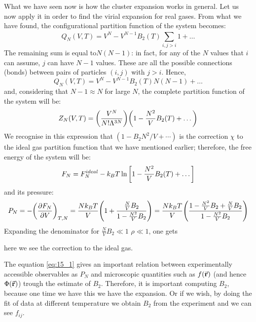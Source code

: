 \documentclass[../main/main.tex]{subfiles}
\begin{document}
What we have seen now is how the cluster expansion works in general. Let us now apply it in order to find the virial expansion for real gases. From what we have found, the configurational partition function of the system becomes:
\begin{equation*}
  Q_N (V,T) = V^N - V^{N-1}  B_2 (T) \sum_{i,j>i}^{} 1 + \dots
\end{equation*}
The remaining sum is equal to\( N(N-1)\): in fact, for any of the \( N \) values that
\( i \) can assume,  \( j \)  can have \( N-1 \) values. These are all the possible connections (bonds) between pairs of particles \( (i,j) \) with \( j>i \).
Hence,
\begin{equation}
  Q_N (V,T) = V^N - V^{N-1}  B_2 (T)  N (N-1) + \dots
\end{equation}
and, considering that  \( N-1 \approx N \) for large \( N \), the complete partition function of the system will be:
\begin{equation}
  Z_N (V,T) = \qty(\frac{V^N}{N! \Lambda ^{3N}}) \qty(1- \frac{N^2}{V} B_2 (T)+ \dots)
\end{equation}
We recognise in this expression that \( (1-B_{2}N^{2}/V+\cdots ) \) is the correction \( \chi  \) to the ideal gas partition function that we have mentioned earlier; therefore, the free energy of the system will be:
\begin{equation}
  F_N = F_N^{ideal} - k_B T \ln{\qty[1-\frac{N^2}{V}B_2 (T)+ \dots] }
\end{equation}
and its pressure:
\begin{equation*}
  P_N = - \qty(\pdv{F_N}{V} )_{T,N} = \frac{N k_B T}{V} \qty(1+ \frac{\frac{N}{V}B_2}{1- \frac{N^2}{V}B_2})
  = \frac{N k_B T}{V} \qty(\frac{1 -\frac{N^2}{V} B_2 + \frac{N}{V} B_2 }{1- \frac{N^2}{V} B_2})
\end{equation*}
Expanding the denominator for \( \frac{N}{V} B_2 \ll 1 \) \( \rho \ll 1 \), one gets
here we see the correction to the ideal gas.
\begin{remark}
The equation \eqref{eq:15_1} gives an important relation between experimentally accessible observables as \( P_N \) and microscopic quantities such as \( f(\va{r}) \) (and hence \( \Phi (\va{r}) \)) trough the estimate of \( B_2 \).
Therefore, it is important computing \( B_2 \), because one time we have this we have the expansion. Or if we wish, by doing the fit of data at different temperature we obtain \( B_2 \) from the experiment and we can see \( f_{ij} \).
\end{remark}
\end{document}
